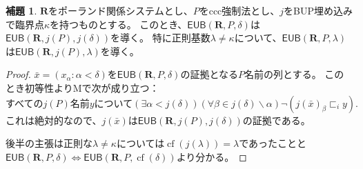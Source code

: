 \documentclass[uplatex,dvipdfmx]{jsarticle}
\newcommand{\cf}{\operatorname{cf}}
\newcommand{\EUB}{\mathsf{EUB}}
\newcommand{\relR}{\mathbf{R}}
\renewcommand{\setminus}{\smallsetminus}
\theoremstyle{definition}
\newtheorem{lem}[thm]{補題}
\begin{document}
	\begin{lem}
		$\relR$をポーランド関係システムとし、$P$をccc強制法とし、$j$をBUP埋め込みで臨界点$\kappa$を持つものとする。
		このとき、$\EUB(\relR, P, \delta)$は$\EUB(\relR, j(P), j(\delta))$を導く。
		特に正則基数$\lambda \ne \kappa$について、$\EUB(\relR, P, \lambda)$は$\EUB(\relR, j(P), \lambda)$を導く。
	\end{lem}
	\begin{proof}
		$\bar{x} = (x_\alpha : \alpha < \delta)$を$\EUB(\relR, P, \delta)$の証拠となる$P$名前の列とする。
		このとき初等性よりMで次が成り立つ：
		\[
			\text{すべての}j(P)\text{名前}y\text{について}(\exists \alpha < j(\delta))(\forall \beta \in j(\delta) \setminus \alpha) \neg(j(\bar{x})_\beta \sqsubset_i 	y).
		\]
		これは絶対的なので、$j(\bar{x})$は$\EUB(\relR, j(P), j(\delta))$の証拠である。

		後半の主張は正則な$\lambda \ne \kappa$については$\cf(j(\lambda)) = \lambda$であったことと$\EUB(\relR, P, \delta) \iff \EUB(\relR, P, \cf(\delta))$より分かる。
	\end{proof}

	\nocite{*}
	\printbibliography[title={参考文献}]
\end{document}
